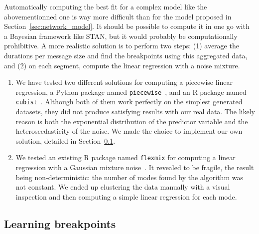             Automatically computing the best fit for a complex model like the abovementionned one is way more difficult
            than for the \dgemm model proposed in Section~\ref{sec:network_model}. It should be possible to compute it
            in one go with a Bayesian framework like STAN, but it would probably be computationally prohibitive. A more
            realistic solution is to perform two steps: (1) average the durations per message size and find the
            breakpoints using this aggregated data, and (2) on each segment, compute the linear regression with a noise
            mixture.
            \begin{enumerate}
                \item We have tested two different solutions for computing a piecewise linear regression, a Python
                    package named \texttt{piecewise}~\cite{datadog}, and an R package named
                    \texttt{cubist}~\cite{cubist}.  Although both of them work perfectly on the simplest generated
                    datasets, they did not produce satisfying results with our real data. The likely reason is both the
                    exponential distribution of the predictor variable and the heteroscedasticity of the noise. We made
                    the choice  to implement our own solution, detailed in Section~\ref{sub:pytree}.
                \item We tested an existing R package named \texttt{flexmix} for computing a linear regression with a
                    Gaussian mixture noise~\cite{flexmix}. It revealed to be fragile, the result being
                    non-deterministic: the number of modes found by the algorithm was not constant. We ended up
                    clustering the data manually with a visual inspection and then computing a simple linear regression
                    for each mode.
            \end{enumerate}

        \subsection{Learning breakpoints}%
        \label{sub:pytree}

